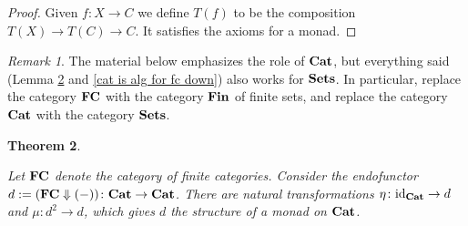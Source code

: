 \documentclass{amsart}
\def\tn{\textnormal}
\def\to{\rightarrow}
\def\taking{\colon}
\def\Down{\Downarrow}
\def\id{\tn{id}}
\def\Cat{{\bf Cat}}
\def\Sets{{\bf Sets}}
\newtheorem{theorem}{Theorem}[section]
\theoremstyle{remark}
\newtheorem{remark}[theorem]{Remark}
\theoremstyle{definition}
\def\Fin{{\bf Fin}}
\def\FC{{\bf FC}}
\begin{document}
\begin{proof}

Given $f\taking X\to C$ we define $T(f)$ to be the composition $T(X)\to T(C)\to C$.  It satisfies the axioms for a monad.

\end{proof}

\begin{remark}

The material below emphasizes the role of $\Cat$, but everything said (Lemma \ref{fc down is monad} and \ref{cat is alg for fc down}) also works for $\Sets$.  In particular, replace the category $\FC$ with the category $\Fin$ of finite sets, and replace the category $\Cat$ with the category $\Sets$.

\end{remark}

\begin{theorem}\label{fc down is monad}

Let $\FC$ denote the category of finite categories.  Consider the endofunctor $d:=(\FC\Down(-))\taking\Cat\to\Cat$.  There are natural transformations $\eta\taking\id_\Cat\to d$ and $\mu\taking d^2\to d$, which gives $d$ the structure of a monad on $\Cat$.  

\end{theorem}
\end{document}
